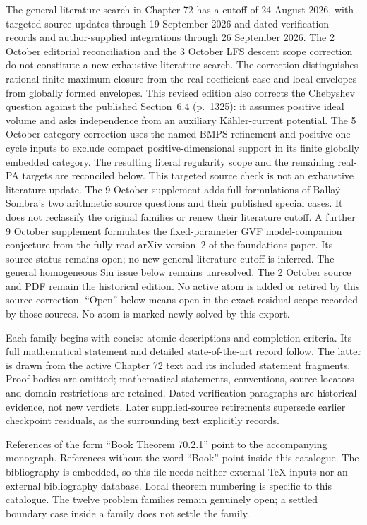 \documentclass[11pt,a4paper]{article}
\theoremstyle{definition}
\theoremstyle{remark}
\begin{document}
The general literature search in Chapter 72 has a cutoff of 24 August
2026, with targeted source updates through 19 September 2026 and dated
verification records and author-supplied integrations through 26 September
2026. The 2 October editorial reconciliation and the 3 October LFS descent
scope correction do not constitute a new exhaustive literature search.
The correction distinguishes rational finite-maximum closure from the
real-coefficient case and local envelopes from globally formed envelopes.
This revised edition also corrects the Chebyshev question against the
published Section~6.4 (p.~1325): it assumes positive ideal volume and
asks independence from an auxiliary K\"ahler-current potential.
The 5 October category correction uses the named BMPS refinement and
positive one-cycle inputs to exclude compact positive-dimensional
support in its finite globally embedded category. The resulting literal
regularity scope and the remaining real-PA targets are reconciled below.
This targeted source check is not an exhaustive literature update.
The 9 October supplement adds full formulations of Balla\"y--Sombra's
two arithmetic source questions and their published special cases.
It does not reclassify the original families or renew their literature
cutoff. A further 9 October supplement formulates the fixed-parameter GVF
model-companion conjecture from the fully read arXiv version~2 of
the foundations paper. Its source status remains open; no new
general literature cutoff is inferred.
The general homogeneous Siu issue below remains unresolved.
The 2 October source and PDF remain the historical edition. No active
atom is added or retired by this source correction.
``Open'' below means open in the exact
residual scope recorded by those sources. No atom is marked newly solved
by this export.

Each family begins with concise atomic descriptions and completion
criteria. Its full mathematical statement and detailed state-of-the-art
record follow. The latter is drawn from the active Chapter 72 text and its
included statement fragments. Proof bodies are omitted; mathematical
statements, conventions, source locators and domain restrictions are
retained. Dated verification paragraphs are historical evidence, not new
verdicts. Later supplied-source retirements supersede earlier checkpoint
residuals, as the surrounding text explicitly records.

References of the form ``Book Theorem 70.2.1'' point to the accompanying
monograph. References without the word ``Book'' point inside this catalogue.
The bibliography is embedded, so this file needs neither external TeX
inputs nor an external bibliography database. Local theorem numbering is
specific to this catalogue. The twelve problem families remain genuinely
open; a settled boundary case inside a family does not settle the family.
\end{document}
